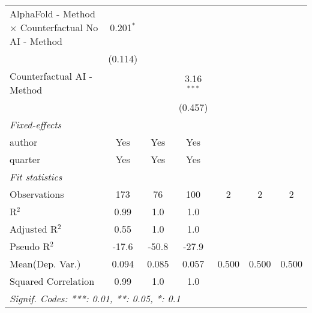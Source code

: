 \begin{tabular}{lcccccc}
   AlphaFold - Method $\times$ Counterfactual No AI - Method  & 0.201$^{*}$    &                &                &     &     &   \\   
                                                              & (0.114)        &                &                &     &     &   \\   
   Counterfactual AI - Method                                 &                &                & 3.16$^{***}$   &     &     &   \\   
                                                              &                &                & (0.457)        &     &     &   \\   
   \midrule
   \emph{Fixed-effects}\\
   author                                                     & Yes            & Yes            & Yes            &     &     & \\  
   quarter                                                    & Yes            & Yes            & Yes            &     &     & \\  
   \midrule
   \emph{Fit statistics}\\
   Observations                                               & 173            & 76             & 100            & 2   & 2   & 2\\  
   R$^2$                                                      & 0.99           & 1.0            & 1.0            &     &     & \\  
   Adjusted R$^2$                                             & 0.55           & 1.0            & 1.0            &     &     & \\  
   Pseudo R$^2$                                               & -17.6          & -50.8          & -27.9          &     &     & \\  
Mean(Dep. Var.) & 0.094 & 0.085 & 0.057 & 0.500 & 0.500 & 0.500 \\
   Squared Correlation                                        & 0.99           & 1.0            & 1.0            &     &     & \\  
   \midrule \midrule
   \multicolumn{7}{l}{\emph{Signif. Codes: ***: 0.01, **: 0.05, *: 0.1}}\\
\end{tabular}
\par\endgroup
